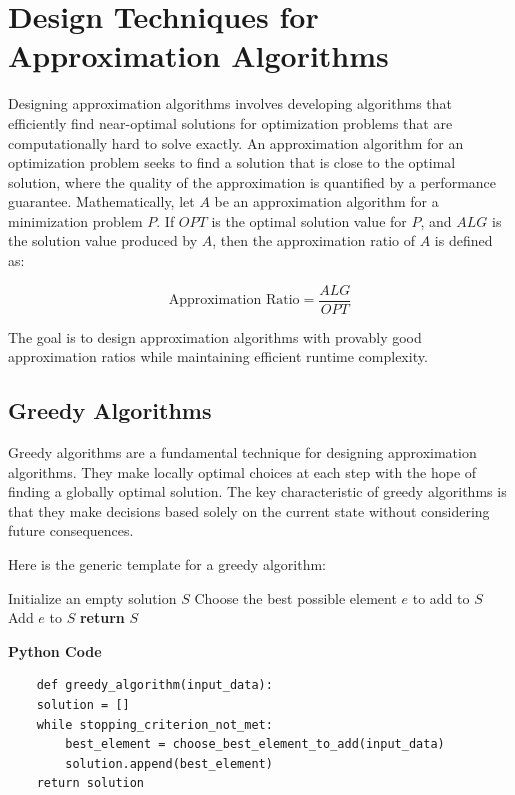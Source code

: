 \documentclass[12pt]{book} %
\begin{document}
\section{Design Techniques for Approximation Algorithms}

Designing approximation algorithms involves developing algorithms that efficiently find near-optimal solutions for optimization problems that are computationally hard to solve exactly. An approximation algorithm for an optimization problem seeks to find a solution that is close to the optimal solution, where the quality of the approximation is quantified by a performance guarantee. Mathematically, let \(A\) be an approximation algorithm for a minimization problem \(P\). If \(OPT\) is the optimal solution value for \(P\), and \(ALG\) is the solution value produced by \(A\), then the approximation ratio of \(A\) is defined as:

\[
\text{Approximation Ratio} = \frac{ALG}{OPT}
\]

The goal is to design approximation algorithms with provably good approximation ratios while maintaining efficient runtime complexity.

\subsection{Greedy Algorithms}

Greedy algorithms are a fundamental technique for designing approximation algorithms. They make locally optimal choices at each step with the hope of finding a globally optimal solution. The key characteristic of greedy algorithms is that they make decisions based solely on the current state without considering future consequences. 

Here is the generic template for a greedy algorithm:
\FloatBarrier
\begin{algorithm}
\caption{Generic Greedy Algorithm}\label{alg:greedy}
\begin{algorithmic}[1]
\State Initialize an empty solution $S$
    \State Choose the best possible element $e$ to add to $S$
    \State Add $e$ to $S$
\EndWhile
\State \textbf{return} $S$
\EndProcedure
\end{algorithmic}
\end{algorithm}
\FloatBarrier
\textbf{Python Code}
\FloatBarrier
\begin{lstlisting}
    def greedy_algorithm(input_data):
    solution = []
    while stopping_criterion_not_met:
        best_element = choose_best_element_to_add(input_data)
        solution.append(best_element)
    return solution
\end{lstlisting}
\end{document}
